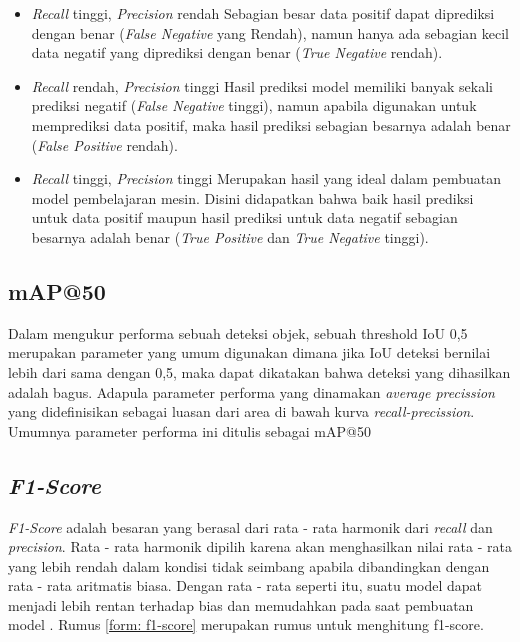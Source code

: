 \begin{itemize}
    \item \textit{Recall} tinggi, \textit{Precision} rendah
          Sebagian besar data positif dapat diprediksi dengan benar (\textit{False Negative} yang Rendah), 
          namun hanya ada sebagian kecil data negatif yang diprediksi dengan benar (\textit{True Negative} 
          rendah).

    \item \textit{Recall} rendah, \textit{Precision} tinggi
          Hasil prediksi model memiliki banyak sekali prediksi negatif (\textit{False Negative} tinggi), 
          namun apabila digunakan untuk memprediksi data positif, maka hasil prediksi sebagian besarnya adalah 
          benar (\textit{False Positive} rendah).

    \item \textit{Recall} tinggi, \textit{Precision} tinggi
          Merupakan hasil yang ideal dalam pembuatan model pembelajaran mesin. Disini didapatkan bahwa baik 
          hasil prediksi untuk data positif maupun hasil prediksi untuk data negatif sebagian besarnya adalah 
          benar (\textit{True Positive} dan \textit{True Negative} tinggi).

\end{itemize}

\subsection{mAP@50}
Dalam mengukur performa sebuah deteksi objek, sebuah threshold IoU 0,5 merupakan parameter yang umum digunakan
dimana jika IoU deteksi bernilai lebih dari sama dengan 0,5, maka dapat dikatakan bahwa deteksi yang
dihasilkan adalah bagus. Adapula parameter performa yang dinamakan \textit{average precission} yang didefinisikan
sebagai luasan dari area di bawah kurva \textit{recall-precission}. Umumnya parameter performa ini ditulis
sebagai mAP@50

\subsection{\textit{F1-Score}}

\textit{F1-Score} adalah besaran yang berasal dari rata - rata harmonik dari \textit{recall} dan 
\textit{precision}. Rata  - rata harmonik dipilih karena akan menghasilkan nilai rata - rata yang lebih rendah 
dalam kondisi tidak seimbang apabila dibandingkan dengan rata - rata aritmatis biasa. Dengan rata - rata seperti 
itu, suatu model dapat menjadi lebih rentan terhadap bias dan memudahkan pada saat pembuatan model 
\cite{metrics_ml}. Rumus \ref{form: f1-score} merupakan rumus untuk menghitung f1-score.

